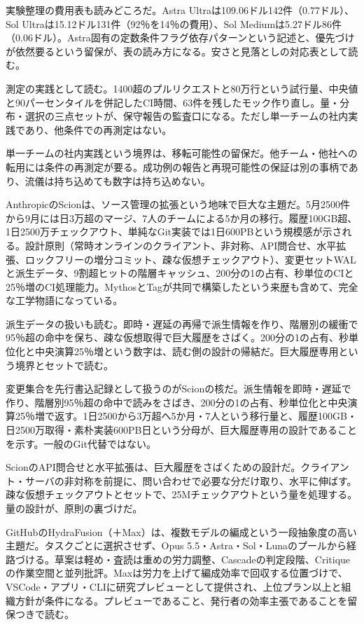 \documentclass[lualatex,a4paper,10pt]{jlreq}
\begin{document}
実験整理の費用表も読みどころだ。Astra Ultraは109.06ドル142件（0.77ドル）、Sol Ultraは15.12ドル131件（92％を14％の費用）、Sol Mediumは5.27ドル86件（0.06ドル）。Astra固有の定数条件フラグ依存パターンという記述と、優先づけが依然要るという留保が、表の読み方になる。安さと見落としの対応表として読む。
\cite{B31}


測定の実践として読む。1400超のプルリクエストと80万行という試行量、中央値と90パーセンタイルを併記したCI時間、63件を残したモック作り直し。量・分布・選択の三点セットが、保守報告の監査口になる。ただし単一チームの社内実践であり、他条件での再測定はない。
\cite{B31}


単一チームの社内実践という境界は、移転可能性の留保だ。他チーム・他社への転用には条件の再測定が要る。成功例の報告と再現可能性の保証は別の事柄であり、流儀は持ち込めても数字は持ち込めない。
\cite{B31}


AnthropicのScionは、ソース管理の拡張という地味で巨大な主題だ。5月2500件から9月には日3万超のマージ、7人のチームによる5か月の移行。履歴100GB超、1日2500万チェックアウト、単純なGit実装では1日600PBという規模感が示される。設計原則（常時オンラインのクライアント、非対称、API問合せ、水平拡張、ロックフリーの増分コミット、疎な仮想チェックアウト）、変更セットWALと派生データ、9割超ヒットの階層キャッシュ、200分の1の占有、秒単位のCIと25％増のCI処理能力。MythosとTagが共同で構築したという来歴も含めて、完全な工学物語になっている。
\cite{B32,B75}


派生データの扱いも読む。即時・遅延の再帰で派生情報を作り、階層別の緩衝で95％超の命中を保ち、疎な仮想取得で巨大履歴をさばく。200分の1の占有、秒単位化と中央演算25％増という数字は、読む側の設計の帰結だ。巨大履歴専用という境界とセットで読む。
\cite{B32,B75}


変更集合を先行書込記録として扱うのがScionの核だ。派生情報を即時・遅延で作り、階層別95％超の命中で読みをさばき、200分の1の占有、秒単位化と中央演算25％増で返す。1日2500から3万超へ5か月・7人という移行量と、履歴100GB・日2500万取得・素朴実装600PB日という分母が、巨大履歴専用の設計であることを示す。一般のGit代替ではない。
\cite{B32,B75}


ScionのAPI問合せと水平拡張は、巨大履歴をさばくための設計だ。クライアント・サーバの非対称を前提に、問い合わせで必要な分だけ取り、水平に伸ばす。疎な仮想チェックアウトとセットで、25Mチェックアウトという量を処理する。量の設計が、原則の裏づけだ。
\cite{B32,B75}


GitHubのHydraFusion（＋Max）は、複数モデルの編成という一段抽象度の高い主題だ。タスクごとに選択させず、Opus 5.5・Astra・Sol・Lunaのプールから経路づける。草案は軽め・査読は重めの労力調整、Cascadeの判定段階、Critiqueの作業空間と並列批評。Maxは労力を上げて編成効率で回収する位置づけで、VSCode・アプリ・CLIに研究プレビューとして提供され、上位プラン以上と組織方針が条件になる。プレビューであること、発行者の効率主張であることを留保つきで読む。
\cite{B33,B76}
\end{document}
